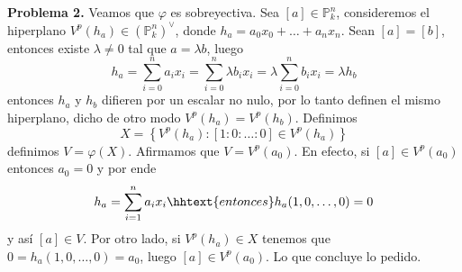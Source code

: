 \documentclass{article}
\def \P {\mathbb{P}}
\begin{document}
\vspace{5mm}
\noindent\textbf{Problema 2.} Veamos que $\varphi$ es sobreyectiva. Sea $[a]\in \P_{k}^{n}$, 
consideremos el hiperplano $V^{p}(h_{a})\in(\P_{k}^{n})^{\lor}$, donde 
$h_{a}=a_{0}x_{0}+\dots+a_{n}x_{n}$. Sean $[a]=[b]$, entonces existe $\lambda\neq0$ tal que 
$a=\lambda b$, luego
\begin{equation*}
    h_{a}=\sum_{i=0}^{n}a_{i}x_{i}=\sum_{i=0}^{n}\lambda b_{i}x_{i}
    =\lambda\sum_{i=0}^{n}b_{i}x_{i}=\lambda h_{b}
\end{equation*}
entonces $h_{a}$ y $h_{b}$ difieren por un escalar no nulo, por lo tanto definen el mismo
hiperplano, dicho de otro modo $V^{p}(h_{a})=V^{p}(h_{b})$. Definimos
\begin{equation*}
    X=\left\{V^{p}(h_{a}):[1:0:\dots:0]\in V^{p}(h_{a})\right\}
\end{equation*}
definimos $V=\varphi(X)$. Afirmamos que $V=V^{p}(a_{0})$. En efecto, si $[a]\in V^{p}(a_{0})$
entonces $a_{0}=0$ y por ende
\begin{equation*}
    h_{a}=\sum_{i=1}^{n}a_{i}x_{i} \hhtext{entonces} h_{a}(1,0,\dots,0)=0
\end{equation*}
y así $[a]\in V$. Por otro lado, si $V^{p}(h_{a})\in X$ tenemos que $0=h_{a}(1,0,\dots,0)=a_{0}$, 
luego $[a]\in V^{p}(a_{0})$. Lo que concluye lo pedido.
\end{document}
